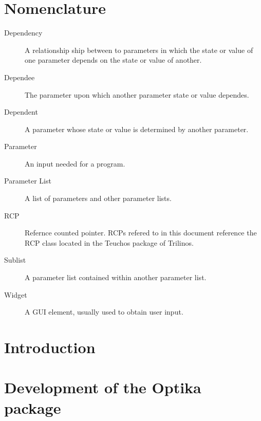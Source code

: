 \documentclass[pdf,ps2pdf,12pt,report,strict,blank]{SANDreport}
\begin{document}
    \chapter*{Nomenclature}
    \begin{description}
	\item[Dependency]
	    A relationship ship between to parameters in which the state
		or value of one parameter depends on the state or value of
		another.
	\item[Dependee]
		The parameter upon which another parameter state or value dependes.
	\item[Dependent]
		A parameter whose state or value is determined by another
		parameter.
	\item[Parameter]
	    An input needed for a program.
	\item[Parameter List]
	    A list of parameters and other parameter lists.
	\item[RCP]
	    Refernce counted pointer. RCPs refered to in this document reference the
		RCP class located in the Teuchos package of Trilinos.
	\item[Sublist]
	    A parameter list contained within another parameter list.
	\item[Widget]
		A GUI element, usually used to obtain user input.
    \end{description}


    \SANDmain		%

    \chapter{Introduction}
	\label{Intro}
	


    \chapter{Development of the Optika package}
	




%	
\end{document}
